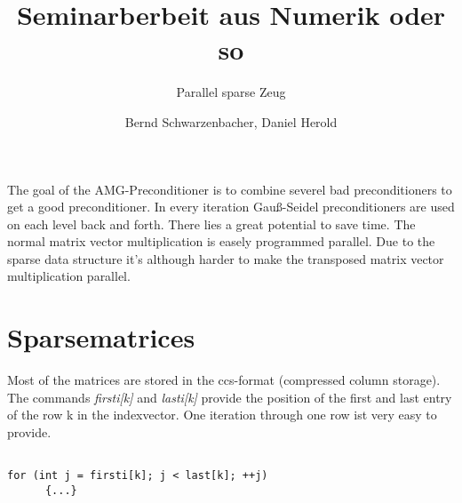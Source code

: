 \documentclass[a4paper,11pt]{scrartcl}
\title{Seminarberbeit aus Numerik oder so}
\subtitle{Parallel sparse Zeug}
\author{Bernd Schwarzenbacher, Daniel Herold}
\begin{document}
\maketitle
\tableofcontents

\pagebreak


The goal of the AMG-Preconditioner is to combine severel bad preconditioners to
get a good preconditioner.
In every iteration Gauß-Seidel preconditioners are used on each level back and
forth. There lies a great potential to save time.
The normal matrix vector multiplication is easely programmed parallel. Due to
the sparse data structure it's although harder to make the transposed matrix
vector multiplication parallel.










\section{Sparsematrices}

Most of the matrices are stored in the ccs-format (compressed column storage).
 The commands {\em firsti[k]} and {\em lasti[k]} provide the position of the
 first and last entry of the row k in the indexvector. One
 iteration through one row ist very easy to provide.

\begin{lstlisting}

for (int j = firsti[k]; j < last[k]; ++j)
      {...}

\end{lstlisting}
\end{document}
